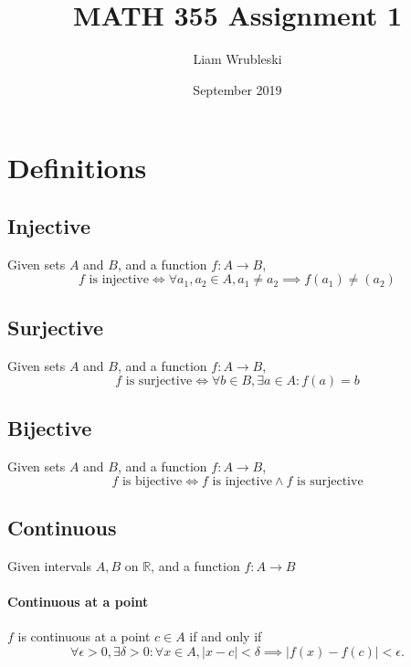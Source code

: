 \documentclass{article}
\title{MATH 355 Assignment 1}
\author{Liam Wrubleski}
\date{September 2019}
\begin{document}


\setcounter{tocdepth}{1}
\setcounter{secnumdepth}{0}
\newcommand{\mapab}[2]{{#1}\xrightarrow{}{#2}}
\newcommand{\mapAb}[2]{\mathbb{#1}\xrightarrow{}{#2}}
\newcommand{\mapaB}[2]{{#1}\xrightarrow{}\mathbb{#2}}
\newcommand{\mapAB}[2]{\mathbb{#1}\xrightarrow{}\mathbb{#2}}
\newcommand{\symintcc}[1]{[-#1,#1]}
\newcommand{\symintco}[1]{[-#1,#1)}
\newcommand{\symintoc}[1]{(-#1,#1]}
\newcommand{\symintoo}[1]{(-#1,#1)}


\maketitle
\tableofcontents

\section{Definitions}
\subsection{Injective}
Given sets $A$ and $B$, and a function $f:\mapab{A}{B}$,
\begin{displaymath}
f \textrm{ is injective} \iff \forall a_1, a_2 \in A, a_1 \neq a_2 \implies f(a_1) \neq (a_2)
\end{displaymath}
\subsection{Surjective}
Given sets $A$ and $B$, and a function $f:\mapab{A}{B}$,
\begin{displaymath}
f \textrm{ is surjective} \iff \forall b \in B, \exists a \in A : f(a) = b
\end{displaymath}
\subsection{Bijective}
Given sets $A$ and $B$, and a function $f:\mapab{A}{B}$,
\begin{displaymath}
f \textrm{ is bijective} \iff f \textrm{ is injective} \land f \textrm{ is surjective}
\end{displaymath}
\subsection{Continuous}
Given intervals $A, B$ on $\mathbb{R}$, and a function $f:\mapab{A}{B}$
\paragraph{Continuous at a point}
$f$ is continuous at a point $c \in A$ if and only if
\begin{displaymath}
\forall \epsilon > 0, \exists \delta > 0 : \forall x \in A, |x-c| < \delta \implies |f(x)-f(c)| < \epsilon.
\end{displaymath}
\end{document}
